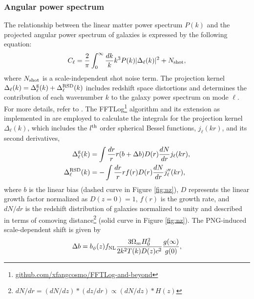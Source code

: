 \subsubsection{Angular power spectrum}
 The relationship between the linear matter power spectrum $P(k)$ and the projected angular power spectrum of galaxies is expressed by the following equation:
\begin{equation}\label{eq:cell}
C_{\ell} = \frac{2}{\pi}\int_{0}^{\infty}\frac{dk}{k}k^{3}P(k)|\Delta_{\ell}(k)|^{2} + N_{\rm shot},
\end{equation}
where $N_{\rm shot}$ is a scale-independent shot noise term. The projection kernel $\Delta_{\ell}(k) = \Delta^{\rm g}_{\ell}(k) + \Delta^{\rm RSD}_{\ell}(k)$ includes redshift space distortions and determines the contribution of each wavenumber $k$ to the galaxy power spectrum on mode $\ell$. For more details, refer to \cite{Padmanabhan2007}. The FFTLog\footnote{\href{https://github.com/xfangcosmo/FFTLog-and-beyond}{github.com/xfangcosmo/FFTLog-and-beyond}} algorithm and its extension as implemented in \cite{fang2020beyond} are employed to calculate the integrals for the projection kernel $\Delta_{\ell}(k)$, which includes the $l^{\rm th}$ order spherical Bessel functions, $ j_{\ell}(kr)$, and its second derivatives,
\begin{align}
    \Delta^{\rm g}_{\ell}(k) &= \int \frac{dr}{r} r (b+\Delta b) D(r) \frac{dN}{dr} j_{\ell}(kr),\\
    \Delta^{\rm RSD}_{\ell}(k) &= - \int \frac{dr}{r} r f(r) D(r) \frac{dN}{dr} j^{\prime\prime}_{\ell}(kr),
\end{align}
where $b$ is the linear bias (dashed curve in Figure \ref{fig:nz}), $D$ represents the linear growth factor normalized as $D(z=0)=1$, $f(r)$ is the growth rate, and $dN/dr$ is the redshift distribution of galaxies normalized to unity and described in terms of comoving distance\footnote{$dN/dr = (dN/dz)*(dz/dr) \propto (dN/dz)*H(z)$} (solid curve in Figure \ref{fig:nz}). The PNG-induced scale-dependent shift is given by \citep[see, also,][]{slosar2008constraints}
\begin{equation}
\Delta b = b_{\phi}(z) f_{\rm NL} \frac{3 \Omega_{m} H^{2}_{0}}{2 k^{2}T(k)D(z) c^{2}} \frac{g(\infty)}{g(0)},
\label{eq:scaledepbias}
\end{equation}
